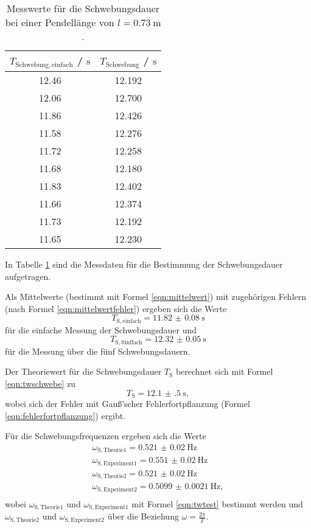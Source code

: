 
\begin{table}
	\centering
	\caption{Messwerte für die Schwebungsdauer bei einer Pendellänge von $l=\SI{0.73}{\meter}$.}
	\label{tab:kalou}
	\begin{tabular}{cc}
		\toprule
		$T_{\mathrm{Schwebung,einfach}}$ / $\si{\second}$ & $T_{\mathrm{Schwebung}}$ / $\si{\second}$ \\
		\midrule
		12.46 & 12.192 \\
		12.06 & 12.700 \\
		11.86 & 12.426 \\
		11.58 & 12.276 \\
		11.72 & 12.258 \\
		11.68 & 12.180 \\
		11.83 & 12.402 \\
		11.66 & 12.374 \\
		11.73 & 12.192 \\
		11.65 & 12.230 \\
		\bottomrule
	\end{tabular}
\end{table}

In Tabelle \ref{tab:kalou} sind die Messdaten für die Bestimmung der Schwebungsdauer 
aufgetragen. 

Als Mittelwerte (bestimmt mit Formel \eqref{eqn:mittelwert}) mit zugehörigen Fehlern (nach
Formel \eqref{eqn:mittelwertfehler}) ergeben sich die Werte 
\begin{equation*}
	T_{\mathrm{S,einfach}} = \SI{11.82(8)}{\second} 
\end{equation*}
für die einfache Messung der Schwebungsdauer und 
\begin{equation*}
	T_{\mathrm{S,fünffach}} = \SI{12.32(5)}{\second} 
\end{equation*}
für die Messung über die fünf Schwebungsdauern.

Der Theoriewert für die Schwebungsdauer $T_{\mathrm{S}}$ berechnet sich mit Formel 
\eqref{eqn:twschwebe} zu
\begin{equation*}
	T_{\mathrm{S}} = \SI{12.1(5)}{\second} \mathrm{,}
\end{equation*}
wobei sich der Fehler mit Gauß'scher Fehlerfortpflanzung (Formel \eqref{eqn:fehlerfortpflanzung})
ergibt.

Für die Schwebungsfrequenzen ergeben sich die Werte 
\begin{gather*}
	\omega_{\mathrm{S,Theorie1}} = \SI{0.521(20)}{\hertz} \\
	\omega_{\mathrm{S,Experiment1}} = \SI{0.551(20)}{\hertz} \\
	\omega_{\mathrm{S,Theorie2}} = \SI{0.521(20)}{\hertz} \\
	\omega_{\mathrm{S,Experiment2}} = \SI{0.5099(21)}{\hertz} \mathrm{,} \\
\end{gather*}
wobei $\omega_{\mathrm{S,Theorie1}}$ und $\omega_{\mathrm{S,Experiment1}}$ mit Formel 
\eqref{eqn:twtest} bestimmt werden und $\omega_{\mathrm{S,Theorie2}}$ und 
$\omega_{\mathrm{S,Experiment2}}$ über die Beziehung $\omega = \frac{2\pi}{T}$.



